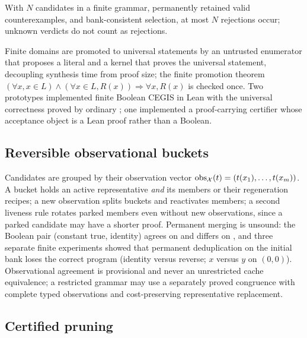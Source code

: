 \begin{proposition}
With $N$ candidates in a finite grammar, permanently retained valid counterexamples, and bank-consistent selection, at most $N$ rejections occur; unknown verdicts do not count as rejections.
\end{proposition}

Finite domains are promoted to universal statements by an untrusted enumerator that proposes a literal and a kernel  that proves the universal statement, decoupling synthesis time from proof size; the finite promotion theorem $(\forall x, x \in L) \wedge (\forall x \in L, R(x)) \Rightarrow \forall x, R(x)$ is checked once. Two prototypes implemented finite Boolean CEGIS in Lean with the universal correctness proved by ordinary ; one implemented a proof-carrying certifier  whose acceptance object is a Lean proof rather than a Boolean.

\subsection{Reversible observational buckets}

Candidates are grouped by their observation vector $\mathrm{obs}_{\mathcal{X}}(t) = (t(x_1), \dots, t(x_m))$. A bucket holds an active representative \emph{and} its members or their regeneration recipes; a new observation splits buckets and reactivates members; a second liveness rule rotates parked members even without new observations, since a parked candidate may have a shorter proof. Permanent merging is unsound: the Boolean pair (constant true, identity) agrees on  and differs on , and three separate finite experiments showed that permanent deduplication on the initial bank loses the correct program (identity versus reverse; $x$ versus $y$ on $(0,0)$). Observational agreement is provisional and never an unrestricted cache equivalence; a restricted grammar may use a separately proved congruence with complete typed observations and cost-preserving representative replacement.

\subsection{Certified pruning}\label{sec:pruning}


